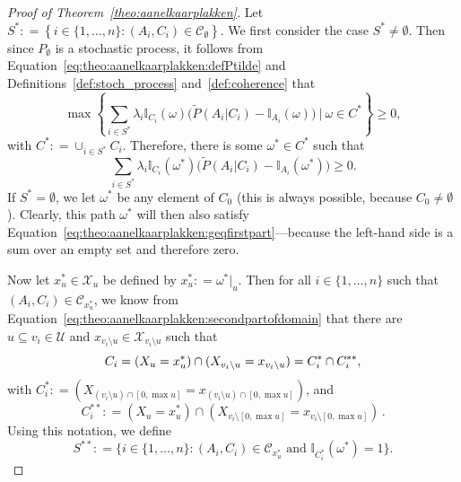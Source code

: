 \documentclass[10pt,a4paper]{paper}
\theoremstyle{definition}
\newcommand{\states}{\mathcal{X}}
\newcommand{\ind}[1]{\mathbb{I}_{#1}}
\newcommand{\coloneqq}{:\!=}
\begin{document}
\begin{proof}[Proof of Theorem~\ref{theo:aanelkaarplakken}]
Let $S^*\coloneqq\left\{i\in\{1,\dots,n\}\colon(A_i,C_i)\in\mathcal{C}_\emptyset\right\}$. We first consider the case $S^*\neq\emptyset$. Then since $P_\emptyset$ is a stochastic process, it follows from Equation~\eqref{eq:theo:aanelkaarplakken:defPtilde} and Definitions~\ref{def:stoch_process} and~\ref{def:coherence} that
\begin{equation*}%
\max\left\{\sum_{i\in S^*}\lambda_i\ind{C_i}(\omega)\bigl(\tilde{P}(A_i\vert C_i)-\ind{A_i}(\omega)\bigr)~\Bigg\vert~\omega\in C^*\right\}\geq0,
\end{equation*}
with $C^*\coloneqq\cup_{i\in S^*}C_i$. Therefore, there is some $\omega^*\in C^*$ such that
\begin{equation}\label{eq:theo:aanelkaarplakken:geqfirstpart}
\sum_{i\in S^*}\lambda_i\ind{C_i}(\omega^*)\bigl(\tilde{P}(A_i\vert C_i)-\ind{A_i}(\omega^*)\bigr)\geq0.
\end{equation}
If $S^*=\emptyset$, we let $\omega^*$ be any element of $C_0$ (this is always possible, because $C_0\neq\emptyset$). Clearly, this path $\omega^*$ will then also satisfy Equation~\eqref{eq:theo:aanelkaarplakken:geqfirstpart}---because the left-hand side is a sum over an empty set and therefore zero.


Now let $x_u^*\in\states_u$ be defined by $x_u^*\coloneqq \omega^*\vert_u$.
Then for all $i\in\{1,\dots,n\}$ such that $(A_i,C_i)\in\mathcal{C}_{x_u^*}$, we know from Equation~\eqref{eq:theo:aanelkaarplakken:secondpartofdomain} that there are $u\subseteq v_i\in\mathcal{U}$ and $x_{v_i\setminus u}\in\states_{v_i\setminus u}$ such that
\begin{equation}\label{eq:theo:aanelkaarplakken:Cisplit}
C_i=(X_u=x_u^*)\cap(X_{v_i\setminus u}=x_{v_i\setminus u})=C_i^*\cap C_i^{**},\vspace{2mm}
\end{equation}
with $C_i^{*}\coloneqq
(X_{(v_i\setminus u)\cap [0,\max u]}=x_{(v_i\setminus u)\cap [0,\max u]})$, and
\begin{equation}\label{eq:theo:aanelkaarplakken:Cistarstar}
C_i^{**}\coloneqq(X_u=x_u^*)\cap(X_{v_i\setminus [0,\max u]}=x_{v_i\setminus [0,\max u]})\,.
\end{equation}
Using this notation, we define
\begin{equation}\label{eq:theo:aanelkaarplakken:Sstarstardef}
S^{**}\coloneqq
\{
i\in\{1,\dots,n\}
\colon
(A_i,C_i)\in\mathcal{C}_{x_u^*}
\text{~and~}
\ind{C_i^*}(\omega^*)=1
\}.
\end{equation}



\end{proof}
\end{document}
